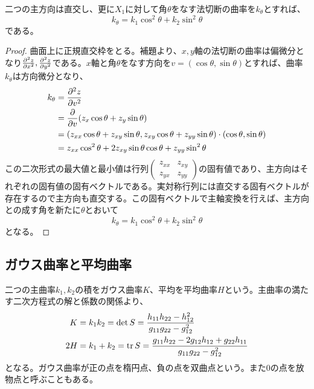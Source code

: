     \begin{thm}
        二つの主方向は直交し、更に$X_1$に対して角$\theta$をなす法切断の曲率を$k_\theta$とすれば、
            \[k_\theta = k_1\cos^2\theta + k_2\sin^2\theta\]
        である。
    \end{thm}
    \begin{proof}
        曲面上に正規直交枠をとる。補題より、$x, y$軸の法切断の曲率は偏微分となり$\pdv[2]{z}{x}, \pdv[2]{z}{y}$である。$x$軸と角$\theta$をなす方向を$v = (\cos\theta, \sin\theta)$とすれば、曲率$k_\theta$は方向微分となり、
        \begin{align*}
            k_\theta &= \pdv[2]{z}{v}\\
                     &= \pdv{v}(z_x\cos\theta + z_y\sin\theta)\\
                     &= (z_{xx}\cos\theta + z_{xy}\sin\theta, z_{xy}\cos\theta + z_{yy}\sin\theta) \cdot (\cos\theta, \sin\theta)\\
                     &= z_{xx}\cos^2\theta + 2z_{xy}\sin\theta\cos\theta + z_{yy}\sin^2\theta
        \end{align*}
        この二次形式の最大値と最小値は行列$\begin{pmatrix}z_{xx} & z_{xy}\\ z_{yx} & z_{yy}\end{pmatrix}$の固有値であり、主方向はそれぞれの固有値の固有ベクトルである。実対称行列には直交する固有ベクトルが存在するので主方向も直交する。この固有ベクトルで主軸変換を行えば、主方向との成す角を新たに$\theta$とおいて
            \[k_\theta = k_1\cos^2\theta + k_2\sin^2\theta\]
        となる。
    \end{proof}

\subsection{ガウス曲率と平均曲率}
    二つの主曲率$k_1, k_2$の積をガウス曲率$K$、平均を平均曲率$H$という。主曲率の満たす二次方程式の解と係数の関係より、
    \begin{align*}
        K &= k_1k_2 = \det S = \frac{h_{11}h_{22} - h_{12}^2}{g_{11}g_{22} - g_{12}^2}\\
        2H &= k_1 + k_2 = \operatorname{tr} S = \frac{g_{11}h_{22} - 2g_{12}h_{12} + g_{22}h_{11}}{g_{11}g_{22} - g_{12}^2}\\
    \end{align*}
    となる。ガウス曲率が正の点を楕円点、負の点を双曲点という。また0の点を放物点と呼ぶこともある。